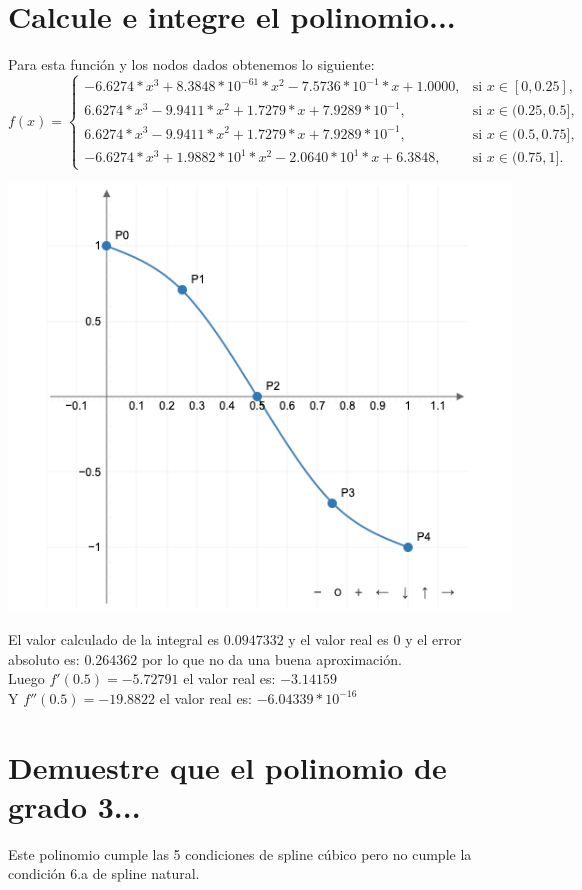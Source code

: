 \documentclass{article}
\begin{document}
\section{Calcule e integre el polinomio...}
Para esta función y los nodos dados obtenemos lo siguiente:\\
$f(x) = \begin{cases}-6.6274* x^3 + 8.3848 * 10^{-61}* x^2 -7.5736 * 10^{-1}* x + 1.0000, & \text{si } x \in [0,0.25], \\
    6.6274* x^3 -9.9411* x^2 + 1.7279* x + 7.9289 * 10^{-1}, & \text{si } x \in (0.25,0.5], \\
    6.6274* x^3 -9.9411* x^2 + 1.7279* x + 7.9289 * 10^{-1}, & \text{si } x \in (0.5,0.75], \\
    -6.6274* x^3 + 1.9882 * 10^{1}* x^2 -2.0640 * 10^{1}* x + 6.3848, & \text{si } x \in (0.75,1].\end{cases}$
\begin{center}
    \includegraphics[scale=0.5]{grafica3.png}
\end{center}
El valor calculado de la integral es ${0.0947332}$ y el valor real es $0$ y el error absoluto es: $0.264362$ por lo que no da una buena aproximación.\\
Luego $f'(0.5) = -5.72791$ el valor real es: $-3.14159$\\
Y $f''(0.5) = {-19.8822}$ el valor real es: $-6.04339*10^{-16}$

\section{Demuestre que el polinomio de grado 3...}
Este polinomio cumple las 5 condiciones de spline cúbico pero no cumple la condición 6.a de spline natural.
\end{document}
